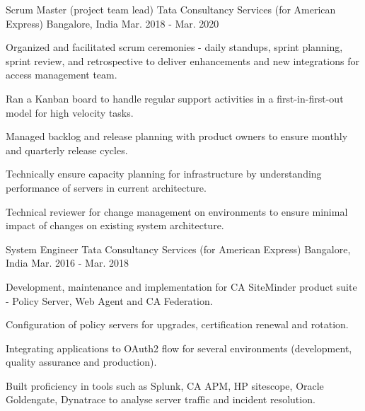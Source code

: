 

\begin{cventries}

  \cventry
    {Scrum Master (project team lead)} %
    {Tata Consultancy Services (for American Express)} %
    {Bangalore, India} %
    {Mar. 2018 - Mar. 2020} %
    {
      \begin{cvitems} %
        \item {Organized and facilitated scrum ceremonies - daily standups, sprint planning, sprint review, and retrospective to deliver enhancements and new integrations for access management team.}
        \item {Ran a Kanban board to handle regular support activities in a first-in-first-out model for high velocity tasks.}
        \item {Managed backlog and release planning with product owners to ensure monthly and quarterly release cycles.}
        \item {Technically ensure capacity planning for infrastructure by understanding performance of servers in current architecture.}
        \item {Technical reviewer for change management on environments to ensure minimal impact of changes on existing system architecture.}
      \end{cvitems}
    }

  \cventry
    {System Engineer} %
    {Tata Consultancy Services (for American Express)} %
    {Bangalore, India} %
    {Mar. 2016 - Mar. 2018} %
    {
      \begin{cvitems} %
        \item {Development, maintenance and implementation for CA SiteMinder product suite - Policy Server, Web Agent and CA Federation.}
        \item {Configuration of policy servers for upgrades, certification renewal and rotation.}
        \item {Integrating applications to OAuth2 flow for several environments (development, quality assurance and production).}
        \item {Built proficiency in tools such as Splunk, CA APM, HP sitescope, Oracle Goldengate, Dynatrace to analyse server traffic and incident resolution.}
      \end{cvitems}
    }

\end{cventries}
